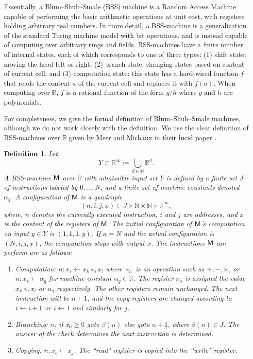 \documentclass{amsart}
\theoremstyle{theorem}
\newtheorem{definition}[theorem]{Definition}
\theoremstyle{remark}
\newcommand{\NN}{\mathbb{N}}
\newcommand{\RR}{\mathbb{R}}
\newcommand{\ccM}{\textsf{\upshape M}}
\begin{document}
Essentially, a Blum--Shub--Smale (BSS) machine is a Random Access Machine capable of performing the basic arithmetic operations at unit cost, with registers holding arbitrary real numbers. In more detail, a BSS-machine is a generalization of the standard Turing machine model with bit operations, and is instead capable of computing over arbitrary rings and fields. BSS-machines have a finite number of internal states, each of which corresponds to one of three types: (1) shift state: moving the head left or right, (2) branch state: changing states based on content of current cell, and (3) computation state: this state has a hard-wired function $f$ that reads the content $a$ of the current cell and replaces it with $f(a)$. When computing over $\RR$, $f$ is  a rational function of the form $g/h$ where $g$ and $h$ are polynomials.

For completeness, we give the formal definition of Blum--Shub--Smale machines, although we do not work closely with the definition. We use the clear definition of BSS-machines over $\RR$ given by Meer and Michaux in their lucid paper \cite{meer1997survey}.

\begin{definition}
Let
\[
Y \subset \RR^\infty\coloneqq \bigcup_{d \in \NN}\RR^d.
\]
A \emph{BSS-machine $\ccM$ over $\RR$ with admissible input set $Y$} is defined by a finite set $J$ of instructions labeled by $0,\dots,N$, and a finite set of \emph{machine constants} denoted $\alpha_q$.
A \emph{configuration} of $\ccM$ is a quadruple
\[
(n, i, j, x) \in J \times \NN \times \NN \times \RR^\infty,
\]
where, $n$ denotes the currently executed instruction, $i$ and $j$ are addresses, and $x$ is the content of the registers of $\ccM$. The initial configuration of $\ccM$'s computation on input $y \in Y$ is $(1, 1, 1, y)$. If $n = N$ and the actual configuration is $(N, i, j, x)$, the computation stops with output $x$. The instructions $\ccM$ can perform are as follows:
\begin{enumerate}
\item \textit{Computation:} $n:x_s \leftarrow x_k \circ_n x_l$ where $\circ_n$ is an operation such as $+,-,\times$, or $n :x_s \leftarrow \alpha_q$ for machine constant $\alpha_q \in \RR$. The register $x_s$ is assigned the value $x_k \circ_n x_l$ or $\alpha_q$ respectively. The other registers remain unchanged. The next instruction will be $n+1$, and the copy registers are changed according to $i \leftarrow i+1$ or $i \leftarrow 1$ and similarly for $j$.
\item \textit{Branching:} \emph{$n$: if $x_0 \geq 0$ goto $\beta(n)$ else goto $n+1$}, where $\beta(n) \in J$. The answer of the check determines the next instruction is determined.
\item \textit{Copying:} \emph{$n:x_i \leftarrow x_j$}. The ``read"-register is copied into the ``write"-register.
\end{enumerate}
\end{definition}
\end{document}
